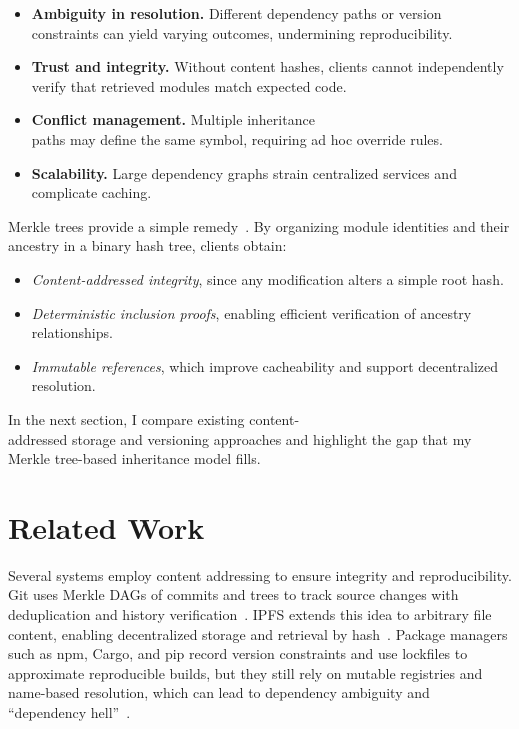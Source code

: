 \documentclass[sigplan,screen]{acmart}
\begin{document}
\begin{itemize}
	\item \textbf{Ambiguity in resolution.} Different dependency paths or version constraints can yield varying outcomes, undermining reproducibility.
	\item \textbf{Trust and integrity.} Without content hashes, clients cannot independently verify that retrieved modules match expected code.
	\item \textbf{Conflict management.} Multiple inheritance \\paths may define the same symbol, requiring ad hoc override rules.
	\item \textbf{Scalability.} Large dependency graphs strain centralized services and complicate caching.
\end{itemize}

Merkle trees provide a simple remedy~\cite{merkle1987, benet2014}. By organizing module identities and their ancestry in a binary hash tree, clients obtain:

\begin{itemize}
	\item \emph{Content-addressed integrity}, since any modification alters a simple root hash.
	\item \emph{Deterministic inclusion proofs}, enabling efficient verification of ancestry relationships.
	\item \emph{Immutable references}, which improve cacheability and support decentralized resolution.
\end{itemize}

In the next section, I compare existing content-\\addressed storage and versioning approaches and highlight the gap that my Merkle tree-based inheritance model fills.

\section{Related Work}
\label{sec:related}

Several systems employ content addressing to ensure integrity and reproducibility. Git uses Merkle DAGs of commits and trees to track source changes with deduplication and history verification~\cite{git}. IPFS extends this idea to arbitrary file content, enabling decentralized storage and retrieval by hash~\cite{benet2014}. Package managers such as npm, Cargo, and pip record version constraints and use lockfiles to approximate reproducible builds, but they still rely on mutable registries and name-based resolution, which can lead to dependency ambiguity and “dependency hell”~\cite{npm_docs,cargo_docs,pip_docs}.
\end{document}
